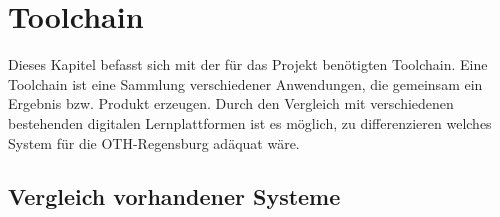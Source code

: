 \section{Toolchain}
Dieses Kapitel befasst sich mit der für das Projekt benötigten Toolchain.
Eine Toolchain ist eine Sammlung verschiedener Anwendungen, die gemeinsam ein
Ergebnis bzw. Produkt erzeugen. Durch den Vergleich mit verschiedenen bestehenden digitalen
Lernplattformen ist es möglich, zu differenzieren welches System für die
OTH-Regensburg adäquat wäre.
\subsection{Vergleich vorhandener Systeme}
